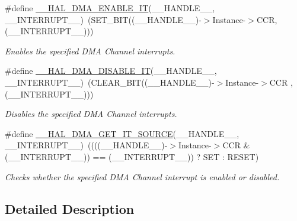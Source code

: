 \begin{DoxyCompactItemize}
\#define \hyperlink{group___d_m_a___exported___macros_ga2124233229c04ca90b790cd8cddfa98b}{\-\_\-\-\_\-\-H\-A\-L\-\_\-\-D\-M\-A\-\_\-\-E\-N\-A\-B\-L\-E\-\_\-\-I\-T}(\-\_\-\-\_\-\-H\-A\-N\-D\-L\-E\-\_\-\-\_\-, \-\_\-\-\_\-\-I\-N\-T\-E\-R\-R\-U\-P\-T\-\_\-\-\_\-)~(S\-E\-T\-\_\-\-B\-I\-T((\-\_\-\-\_\-\-H\-A\-N\-D\-L\-E\-\_\-\-\_\-)-\/$>$Instance-\/$>$C\-C\-R, (\-\_\-\-\_\-\-I\-N\-T\-E\-R\-R\-U\-P\-T\-\_\-\-\_\-)))
\begin{DoxyCompactList}\small\item\em Enables the specified D\-M\-A Channel interrupts. \end{DoxyCompactList}\item 
\#define \hyperlink{group___d_m_a___exported___macros_ga2867eab09398df2daac55c3f327654da}{\-\_\-\-\_\-\-H\-A\-L\-\_\-\-D\-M\-A\-\_\-\-D\-I\-S\-A\-B\-L\-E\-\_\-\-I\-T}(\-\_\-\-\_\-\-H\-A\-N\-D\-L\-E\-\_\-\-\_\-, \-\_\-\-\_\-\-I\-N\-T\-E\-R\-R\-U\-P\-T\-\_\-\-\_\-)~(C\-L\-E\-A\-R\-\_\-\-B\-I\-T((\-\_\-\-\_\-\-H\-A\-N\-D\-L\-E\-\_\-\-\_\-)-\/$>$Instance-\/$>$C\-C\-R , (\-\_\-\-\_\-\-I\-N\-T\-E\-R\-R\-U\-P\-T\-\_\-\-\_\-)))
\begin{DoxyCompactList}\small\item\em Disables the specified D\-M\-A Channel interrupts. \end{DoxyCompactList}\item 
\#define \hyperlink{group___d_m_a___exported___macros_ga206f24e6bee4600515b9b6b1ec79365b}{\-\_\-\-\_\-\-H\-A\-L\-\_\-\-D\-M\-A\-\_\-\-G\-E\-T\-\_\-\-I\-T\-\_\-\-S\-O\-U\-R\-C\-E}(\-\_\-\-\_\-\-H\-A\-N\-D\-L\-E\-\_\-\-\_\-, \-\_\-\-\_\-\-I\-N\-T\-E\-R\-R\-U\-P\-T\-\_\-\-\_\-)~((((\-\_\-\-\_\-\-H\-A\-N\-D\-L\-E\-\_\-\-\_\-)-\/$>$Instance-\/$>$C\-C\-R \& (\-\_\-\-\_\-\-I\-N\-T\-E\-R\-R\-U\-P\-T\-\_\-\-\_\-)) == (\-\_\-\-\_\-\-I\-N\-T\-E\-R\-R\-U\-P\-T\-\_\-\-\_\-)) ? S\-E\-T \-: R\-E\-S\-E\-T)
\begin{DoxyCompactList}\small\item\em Checks whether the specified D\-M\-A Channel interrupt is enabled or disabled. \end{DoxyCompactList}\end{DoxyCompactItemize}


\subsection{Detailed Description}


